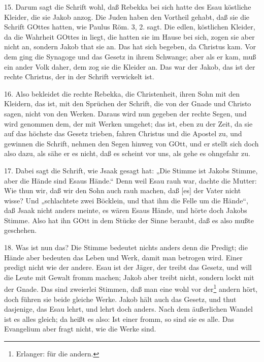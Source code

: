 15. Darum sagt die Schrift wohl, daß Rebekka bei sich hatte des Esau köstliche Kleider, die sie Jakob anzog. Die Juden haben den Vortheil gehabt, daß sie die Schrift GOttes hatten, wie Paulus Röm. 3, 2. sagt. Die edlen, köstlichen Kleider, da die Wahrheit GOttes in liegt, die hatten sie im Hause bei sich, zogen sie aber nicht an, sondern Jakob that sie an. Das hat sich begeben, da Christus kam. Vor dem ging die Synagoge und das Gesetz in ihrem Schwange; aber als er kam, muß ein ander Volk daher, dem zog sie die Kleider an. Das war der Jakob, das ist der rechte Christus, der in der Schrift verwickelt ist.

16. Also bekleidet die rechte Rebekka, die Christenheit, ihren Sohn mit den Kleidern, das ist, mit den Sprüchen der Schrift, die von der Gnade und Christo sagen, nicht von den Werken. Daraus wird nun gegeben der rechte Segen, und wird genommen dem, der mit Werken umgehet; das ist, eben zu der Zeit, da sie auf das höchste das Gesetz trieben, fahren Christus und die Apostel zu, und gewinnen die Schrift, nehmen den Segen hinweg von GOtt, und er stellt sich doch also dazu, als sähe er es nicht, daß es scheint vor uns, als gehe es ohngefahr zu.

17. Dabei sagt die Schrift, wie Jsaak gesagt hat: „Die Stimme ist Jakobs Stimme, aber die Hände sind Esaus Hände.“ Denn weil Esau rauh war, dachte die Mutter: Wie thun wir, daß wir den Sohn auch rauh machen, daß [es] der Vater nicht wisse? Und „schlachtete zwei Böcklein, und that ihm die Felle um die Hände“, daß Jsaak nicht anders meinte, es wären Esaus Hände, und hörte doch Jakobs Stimme. Also hat ihn GOtt in dem Stücke der Sinne beraubt, daß es also mußte geschehen.

18. Was ist nun das? Die Stimme bedeutet nichts anders denn die Predigt; die Hände aber bedeuten das Leben und Werk, damit man betrogen wird. Einer predigt nicht wie der andere. Esau ist der Jäger, der treibt das Gesetz, und will die Leute mit Gewalt fromm machen; Jakob aber treibt nicht, sondern lockt mit der Gnade. Das sind zweierlei Stimmen, daß man eine wohl vor der\footnote{Erlanger: für die andern.} andern hört, doch führen sie beide gleiche Werke. Jakob hält auch das Gesetz, und thut dasjenige, das Esau lehrt, und lehrt doch anders. Nach dem äußerlichen Wandel ist es alles gleich; da heißt es also: Ist einer fromm, so sind sie es alle. Das Evangelium aber fragt nicht, wie die Werke sind.

